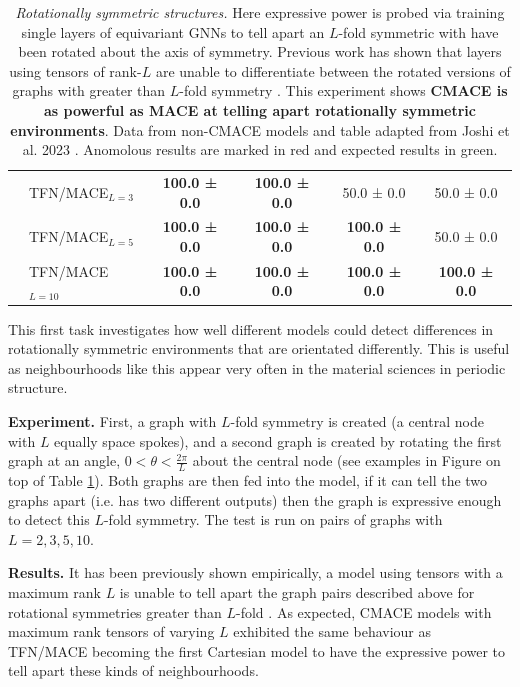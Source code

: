 \begin{table}[H]
{\begin{tabular}{clcccc}
        & TFN/MACE$_{L=3}$ & \cellcolor{green!10} \textbf{100.0 ± 0.0} & \cellcolor{green!10} \textbf{100.0 ± 0.0} & 50.0 ± 0.0 & 50.0 ± 0.0 \\
        & TFN/MACE$_{L=5}$ & \cellcolor{green!10} \textbf{100.0 ± 0.0} & \cellcolor{green!10} \textbf{100.0 ± 0.0} & \cellcolor{green!10} \textbf{100.0 ± 0.0} & 50.0 ± 0.0 \\
        & TFN/MACE$_{L=10}$ & \cellcolor{green!10} \textbf{100.0 ± 0.0} & \cellcolor{green!10} \textbf{100.0 ± 0.0} & \cellcolor{green!10} \textbf{100.0 ± 0.0} & \cellcolor{green!10} \textbf{100.0 ± 0.0} \\
        \bottomrule
    \end{tabular}  
    }
    \caption{\textit{Rotationally symmetric structures.} Here expressive power is probed via training single layers of equivariant GNNs to tell apart an $L$-fold symmetric with have been rotated about the axis of symmetry. Previous work has shown that layers using tensors of rank-$L$ are unable to differentiate between the rotated versions of graphs with greater than $L$-fold symmetry \cite{joshi2023expressive}. This experiment shows \textbf{CMACE is as powerful as MACE at telling apart rotationally symmetric environments}. Data from non-CMACE models and table adapted from Joshi et al. 2023 \cite{joshi2023expressive}. Anomolous results are marked in \colorbox{red!10}{red} and expected results in \colorbox{green!10}{green}.
    }
    \label{tab:rotsym}
\end{table}

This first task investigates how well different models could detect differences in rotationally symmetric environments that are orientated differently. This is useful as neighbourhoods like this appear very often in the material sciences in periodic structure. 

\textbf{Experiment. } First, a graph with $L$-fold symmetry is created (a central node with $L$ equally space spokes), and a second graph is created by rotating the first graph at an angle, $0 < \theta < \frac {2\pi} L$ about the central node (see examples in Figure on top of Table \ref{tab:rotsym}). Both graphs are then fed into the model, if it can tell the two graphs apart (i.e. has two different outputs) then the graph is expressive enough to detect this $L$-fold symmetry. The test is run on pairs of graphs with $L=2,3,5,10$.

\textbf{Results. } It has been previously shown empirically, a model using tensors with a maximum rank $L$ is unable to tell apart the graph pairs described above for rotational symmetries greater than $L$-fold \cite{joshi2023expressive}. As expected, CMACE models with maximum rank tensors of varying $L$ exhibited the same behaviour as TFN/MACE becoming the first Cartesian model to have the expressive power to tell apart these kinds of neighbourhoods.


